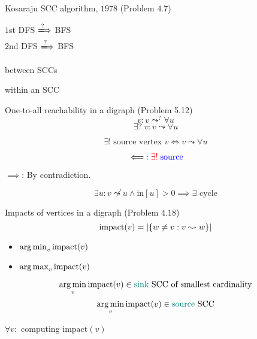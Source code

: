 \begin{frame}{}
  \begin{exampleblock}{Kosaraju SCC algorithm, $1978$ (Problem $4.7$)}
    \begin{center}
      $1$st DFS $\xLongrightarrow{?}$ BFS \\[8pt]
      $2$nd DFS $\xLongrightarrow{?}$ BFS
    \end{center}
  \end{exampleblock}

  \pause
  \vspace{0.50cm}
  \begin{description}
    \centering
    \item[$1$st DFS:]  between SCCs
    \item[$2$nd DFS:]  within an SCC
  \end{description}

  \pause
  \vspace{0.50cm}
  \centerline{}
\end{frame}
\begin{frame}{}
  \begin{exampleblock}{One-to-all reachability in a digraph (Problem 5.12)}
    \[
      v: v \leadsto^{?} \forall u
    \]
    \[
      \exists?\; v: v \leadsto \forall u
    \]
  \end{exampleblock}

  \pause
  \vspace{0.60cm}
  \centerline{}

  \[
    \exists!\; \text{source vertex } v \iff v \leadsto \forall u
  \]

  \pause
  \[
    \impliedby: \textcolor{red}{\exists!}\; \textcolor{blue}{\text{source}}
  \]

  \pause
  \centerline{$\implies$: By contradiction.}
  \[
    \exists u: v \not\leadsto u \land \text{in}[u] > 0 \implies \exists \text{ cycle}
  \]
\end{frame}
\begin{frame}{}
  \begin{exampleblock}{Impacts of vertices in a digraph (Problem $4.18$)}
    \[
      \text{impact}(v) = |\{w \neq v: v \leadsto w\}|
    \]

    \begin{itemize}
      \centering
      \item $\operatorname*{arg\,min}_{v} \text{impact}(v)$
      \item $\operatorname*{arg\,max}_{v} \text{impact}(v)$
    \end{itemize}
  \end{exampleblock}

  \pause
  \[
    \operatorname*{arg\,min}_{v} \text{impact}(v) \in \text{\textcolor{teal}{sink} SCC of smallest cardinality}
  \]
  \pause
  \[
    \operatorname*{arg\,min}_{v} \text{impact}(v) \in \text{\textcolor{teal}{source} SCC}
  \]

  \pause
  \vspace{0.30cm}
  \centerline{ $\forall v:$ computing $\text{impact}(v)$}
\end{frame}
